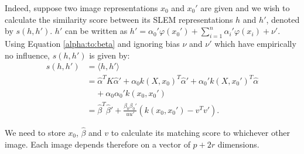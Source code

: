 Indeed, suppose two image representations $x_0$ and $x_0'$ are given and we wish to calculate the similarity score between its SLEM representations $h$ and $h'$, denoted by $s(h,h')$. $h'$ can be written as $h'=\alpha_0'\varphi(x_0')+\sum_{i=1}^n \alpha_i'\varphi (x_i)+\nu'$. Using Equation \ref{alpha:to:beta} and ignoring bias $\nu$ and $\nu'$ which have empirically no influence, $s(h,h')$ is given by:
\begin{equation}
\begin{split}
s(h,h') & = \langle h, h'\rangle \\
		& = \hat{\alpha}^{T} K\hat{\alpha}'+\alpha_0k(X, x_0)^T\hat{\alpha}'+\alpha_0'k(X, x_0')^T\hat{\alpha} \\
		& \ \ \ \ \ +\alpha_0\alpha_0'k(x_0,x_0')\\
		& = \hat{\beta}^T\hat{\beta}'+\frac{\beta_0\beta_0'}{uu'}(k(x_0,x_0')-v^Tv').
\end{split}
\end{equation}

We need to store $x_0$, $\hat{\beta}$ and $v$ to calculate its matching score to whichever other image. Each image depends therefore on a vector of $p+2r$ dimensions.

